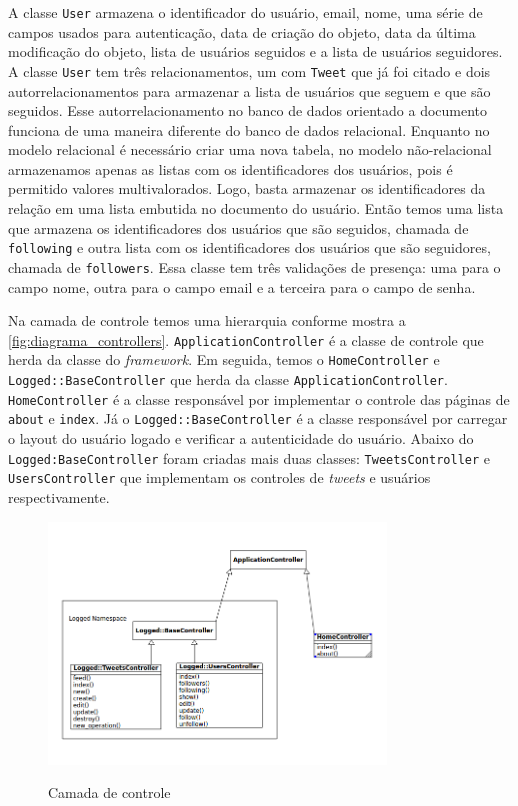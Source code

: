 A classe \verb|User| armazena o identificador do usuário, email, nome, uma série de campos usados para autenticação, data de criação do objeto, data da última modificação do objeto, lista de usuários seguidos e a lista de usuários seguidores. A classe \verb|User| tem três relacionamentos, um com \verb|Tweet| que já foi citado e dois autorrelacionamentos para armazenar a lista de usuários que seguem e que são seguidos. Esse autorrelacionamento no banco de dados orientado a documento funciona de uma maneira diferente do banco de dados relacional.
Enquanto no modelo relacional é necessário criar uma nova tabela, no modelo não-relacional armazenamos apenas as listas com os identificadores dos usuários, pois é permitido valores multivalorados. Logo, basta armazenar os identificadores da relação em uma lista embutida no documento do usuário. Então temos uma lista que armazena os identificadores dos usuários que são seguidos, chamada de \verb|following| e outra lista com os identificadores dos usuários que são seguidores, chamada de \verb|followers|.
Essa classe tem três validações de presença: uma para o campo nome, outra para o campo email e a terceira para o campo de senha.

Na camada de controle temos uma hierarquia conforme mostra a \autoref{fig:diagrama_controllers}. \verb|ApplicationController| é a classe de controle que herda da classe do \textit{framework}. Em seguida, temos o \verb|HomeController| e \verb|Logged::BaseController| que herda  da classe \verb|ApplicationController|. \verb|HomeController| é a classe responsável por implementar o controle das páginas de \verb|about| e \verb|index|. Já o \verb|Logged::BaseController| é a classe responsável por carregar o layout do usuário logado e verificar a autenticidade do usuário.
Abaixo do \verb|Logged:BaseController| foram criadas mais duas classes: \verb|TweetsController| e \verb|UsersController| que implementam os controles de \textit{tweets} e usuários respectivamente.
\begin{figure}[H]
    \centering
    \caption{Camada de controle}
    \includegraphics[width=0.8\textwidth]{./04-figuras/controllers_complete.png}
    \label{fig:diagrama_controllers}
\end{figure}

